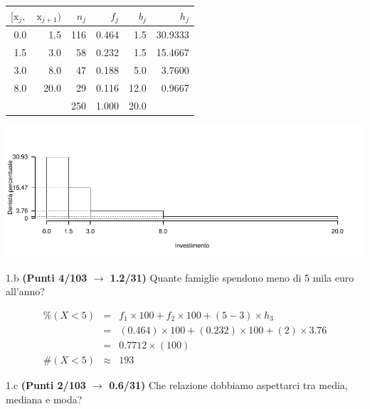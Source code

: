 \documentclass[
  11pt,
]{book}
\theoremstyle{mytheoremstyle}
\theoremstyle{mydefstyle}
\newenvironment{sol}
  {
  \begin{tcolorbox}[enhanced,breakable,arc=0.1mm,boxrule=1pt,colback=white,colframe=iblue,
  title=\bf \fontfamily{lmss}\selectfont \hspace{.5 cm} Soluzione,drop fuzzy shadow]

}{
\end{tcolorbox}
  }
\begin{document}
\begin{sol}

\begin{table}[H]
\centering
\begin{tabular}{rrrrrr}
\toprule
$[\text{x}_j,$ & $\text{x}_{j+1})$ & $n_j$ & $f_j$ & $b_j$ & $h_j$\\
\midrule
0.0 & 1.5 & 116 & 0.464 & 1.5 & 30.9333\\
1.5 & 3.0 & 58 & 0.232 & 1.5 & 15.4667\\
3.0 & 8.0 & 47 & 0.188 & 5.0 & 3.7600\\
8.0 & 20.0 & 29 & 0.116 & 12.0 & 0.9667\\
 &  & 250 & 1.000 & 20.0 & \\
\bottomrule
\end{tabular}
\end{table}

\begin{center}\includegraphics{Esami_passati_con_soluzioni_files/figure-latex/2024-73-1} \end{center}

\end{sol}

1.b \textbf{(Punti 4/103 \(\rightarrow\) 1.2/31)} Quante famiglie spendono meno di 5 mila euro all'anno?

\begin{sol}
\begin{eqnarray*}
     \%(X< 5 ) &=&  f_{ 1 }\times 100+f_{ 2 }\times 100 +( 5 - 3 )\times h_{ 3 } \\
              &=&  ( 0.464 )\times 100+( 0.232 )\times 100 +( 2 )\times  3.76  \\
              &=&  0.7712 \times(100) \\
     \#(X< 5 ) &\approx& 193 
         \end{eqnarray*}

\end{sol}

1.c \textbf{(Punti 2/103 \(\rightarrow\) 0.6/31)} Che relazione dobbiamo aspettarci tra media, mediana e moda?
\end{document}
